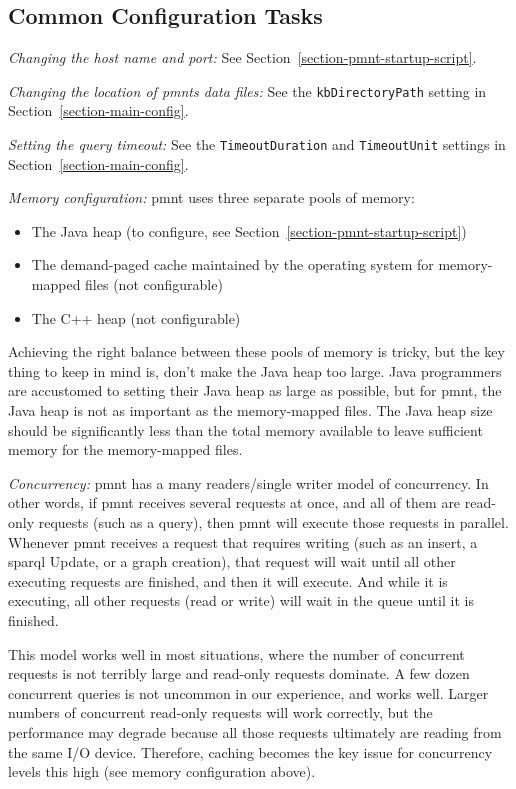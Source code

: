 \subsection{Common Configuration Tasks}
\label{section-common-config-tasks}

\emph{Changing the host name and port:} See Section~\ref{section-pmnt-startup-script}.

\emph{Changing the location of \acp{pmnt} data files:} See the \texttt{kbDirectoryPath} setting in Section~\ref{section-main-config}.

\emph{Setting the query timeout:} See the \texttt{TimeoutDuration} and \texttt{TimeoutUnit} settings in Section~\ref{section-main-config}.

\emph{Memory configuration:} \ac{pmnt} uses three separate pools of memory:
\begin{itemize}[noitemsep]
	\item The Java heap (to configure, see Section~\ref{section-pmnt-startup-script})
	\item The demand-paged cache maintained by the operating system for memory-mapped files (not configurable)
	\item The C++ heap (not configurable)
\end{itemize}

Achieving the right balance between these pools of memory is tricky, but the key thing to keep in mind is, don't make the Java heap too large. Java programmers are accustomed to setting their Java heap as large as possible, but for \ac{pmnt}, the Java heap is not as important as the memory-mapped files. The Java heap size should be significantly less than the total memory available to leave sufficient memory for the memory-mapped files.

\emph{Concurrency:} \ac{pmnt} has a many readers/single writer model of concurrency.  In other words, if \ac{pmnt} receives several requests at once, and all of them are read-only requests (such as a query), then \ac{pmnt} will execute those requests in parallel.  Whenever \ac{pmnt} receives a request that requires writing (such as an insert, a \ac{sparql} Update, or a graph creation), that request will wait until all other executing requests are finished, and then it will execute. And while it is executing, all other requests (read or write) will wait in the queue until it is finished.

This model works well in most situations, where the number of concurrent requests is not terribly large and read-only requests dominate.  A few dozen concurrent queries is not uncommon in our experience, and works well.  Larger numbers of concurrent read-only requests will work correctly, but the performance may degrade because all those requests ultimately are reading from the same I/O device.  Therefore, caching becomes the key issue for concurrency levels this high (see memory configuration above).

